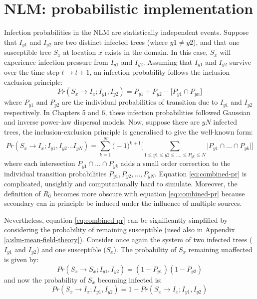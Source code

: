 \newpage

\section{NLM: probabilistic implementation}
\label{A:combiniing-probabilities}

Infection probabilities in the NLM are statistically independent events.
Suppose that $I_{y1}$ and $I_{y2}$ are two distinct infected trees (where $y1 \neq y2$), and that one susceptible tree $S_x$ at location $x$ exists in the domain.
In this case, $S_x$ will experience infection pressure from $I_{y1}$ and $I_{y2}$.
Assuming that $I_{y1}$ and $I_{y2}$ survive over the time-step $t \rightarrow t + 1$, an infection probability follows the inclusion-exclusion principle:
\begin{equation}
    Pr(S_x \rightarrow I_{x}; I_{y1}, I_{y2}) = P_{y1} + P_{y2} - \big[ P_{y1} \cap P_{yn} \big] 
\end{equation}
where $P_{y1}$ and $P_{y2}$ are the individual probabilities of transition due to $I_{y1}$ and $I_{y2}$ respectively.
In Chapters 5 and 6, these infection probabilities followed Gaussian and inverse power-law dispersal models.
Now, suppose there are $yN$ infected trees, the inclusion-exclusion principle is generalised to give the well-known form:
\begin{equation}
\label{eq:combined-pr}
     Pr(S_x \rightarrow I_{x}; I_{y1}, I_{y2}...I_{yN}) = \sum_{k=1}^{N} \big(  -1 \big)^{k+1} \Big[ \sum _{1\leq y1 \leq y2 \leq....\leq P_{yk} \leq N} \big| P_{y1}\cap ...\cap P_{yk}  \big|   \Big]
\end{equation}
where each intersection $P_{y1} \cap ... \cap P_{yk}$ adds a small order correction to the individual transition probabilities $P_{y1}, P_{y2},..., P_{yN}$.
Equation \ref{eq:combined-pr} is complicated, unsightly and computationally hard to simulate.
Moreover, the definition of $R_0$ becomes more obscure with equation \ref{eq:combined-pr} because secondary can in principle be induced under the influence of multiple sources.

Nevertheless, equation \ref{eq:combined-pr} can be significantly simplified by considering the probability of remaining susceptible (used also in Appendix \ref{a:slm-mean-field-theory}). 
Consider once again the system of two infected trees ($I_{y1}$ and $I_{y2}$) and one susceptible ($S_x$).
The probability of $S_x$ remaining unaffected is given by:
\begin{equation}
    Pr(S_x \rightarrow S_{x}; I_{y1}, I_{y2}) = (1 - P_{y1})(1 -P_{y2})
\end{equation}
and now the probability of $S_x$ becoming infected is:
\begin{equation}
\label{eq:pr-simp}
    Pr(S_x \rightarrow I_{x}; I_{y1}, I_{y2}) = 1 - Pr(S_x \rightarrow I_{x}; I_{y1}, I_{y2})
\end{equation}


